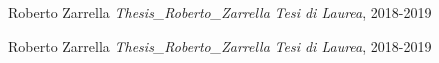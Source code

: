 \begin{frame}
\frametitle{\refname}
   \begin{thebibliography}{9}
   \small

       Roberto Zarrella
      \newblock \textit{Thesis_Roberto_Zarrella}
      \newblock \emph{Tesi di Laurea}, 2018-2019
      

       Roberto Zarrella
      \newblock \textit{Thesis_Roberto_Zarrella}
      \newblock \emph{Tesi di Laurea}, 2018-2019
      
   
   \end{thebibliography}
\end{frame}